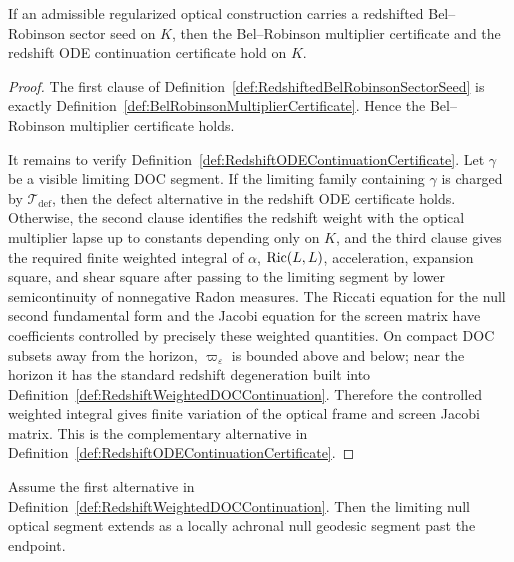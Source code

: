 \begin{theorem}\label{thm:RedshiftedBelRobinsonSectorSeed}
If an admissible regularized optical construction carries a redshifted Bel--Robinson sector seed on $K$, then the Bel--Robinson multiplier certificate and the redshift ODE continuation certificate hold on $K$.
\end{theorem}

\begin{proof}
The first clause of Definition~\ref{def:RedshiftedBelRobinsonSectorSeed} is exactly Definition~\ref{def:BelRobinsonMultiplierCertificate}. Hence the Bel--Robinson multiplier certificate holds.

It remains to verify Definition~\ref{def:RedshiftODEContinuationCertificate}. Let $\gamma$ be a visible limiting DOC segment. If the limiting family containing $\gamma$ is charged by $\mathcal T_{\mathrm{def}}$, then the defect alternative in the redshift ODE certificate holds. Otherwise, the second clause identifies the redshift weight with the optical multiplier lapse up to constants depending only on $K$, and the third clause gives the required finite weighted integral of $\alpha$, $\mathrm{Ric}(L,L)$, acceleration, expansion square, and shear square after passing to the limiting segment by lower semicontinuity of nonnegative Radon measures. The Riccati equation for the null second fundamental form and the Jacobi equation for the screen matrix have coefficients controlled by precisely these weighted quantities. On compact DOC subsets away from the horizon, $\varpi_\varepsilon$ is bounded above and below; near the horizon it has the standard redshift degeneration built into Definition~\ref{def:RedshiftWeightedDOCContinuation}. Therefore the controlled weighted integral gives finite variation of the optical frame and screen Jacobi matrix. This is the complementary alternative in Definition~\ref{def:RedshiftODEContinuationCertificate}.
\end{proof}

\begin{lemma}\label{lem:RedshiftFiniteVariationContinuation}
Assume the first alternative in Definition~\ref{def:RedshiftWeightedDOCContinuation}. Then the limiting null optical segment extends as a locally achronal null geodesic segment past the endpoint.
\end{lemma}

